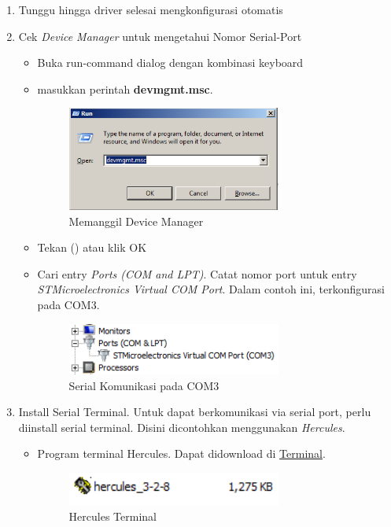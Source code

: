 \documentclass{article}
\begin{document}
\begin{enumerate}
		\item Tunggu hingga driver selesai mengkonfigurasi otomatis

		\item Cek \textit{Device Manager} untuk mengetahui Nomor Serial-Port
		\begin{itemize}
			\item Buka run-command dialog dengan kombinasi keyboard %

			\item masukkan perintah \textbf{devmgmt.msc}.
			\begin{figure}[H]
				\centering
				\includegraphics[width=200pt]{images/software/devicemgr}
				\caption{Memanggil Device Manager}
			\end{figure}

			\item Tekan (\keys{\return}) atau klik OK

			\item Cari entry \textit{Ports (COM and LPT)}.
			Catat nomor port untuk entry \textit{STMicroelectronics Virtual COM Port}.
			Dalam contoh ini, terkonfigurasi pada COM3.

			\begin{figure}[H]
				\centering
				\includegraphics[width=200pt]{images/software/comport}
				\caption{Serial Komunikasi pada COM3}
			\end{figure}
		\end{itemize}


		\item Install Serial Terminal.
		Untuk dapat berkomunikasi via serial port, perlu diinstall serial terminal.
		Disini dicontohkan menggunakan \textit{Hercules}.

		\begin{itemize}
			\item Program terminal Hercules. Dapat didownload di \href{https://drive.google.com/drive/folders/1fgNPnGeSm20TrFfwmeCa4B24WIN_t_o_?usp=share_link}{Terminal}.
			\begin{figure}[H]
				\centering
				\includegraphics[width=200pt]{images/software/hercules}
				\caption{Hercules Terminal}
			\end{figure}


\end{itemize}
\end{enumerate}
\end{document}

